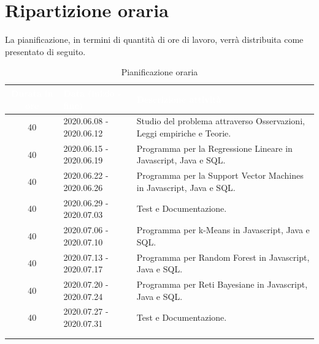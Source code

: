 \section{Ripartizione oraria}
La pianificazione, in termini di quantità di ore di lavoro, verrà distribuita come presentato di seguito.
{\renewcommand{\arraystretch}{2}
\begin{longtable}{|c|p{4cm}|p{7cm}|}
	
		\hline \rowcolor{blue}
		\textbf{\textcolor{white}{Durata in ore}} &
		\textbf{\textcolor{white}{Data (inizio - fine)}} & 
		\textbf{\textcolor{white}{Descrizione attività}}  \\ \hline
		\endhead
		\hline \rowcolor{lightbrown}
		40 & 
		2020.06.08 - 2020.06.12 & 
		Studio del problema attraverso Osservazioni, Leggi empiriche e Teorie. \\	
	\hline \rowcolor{lighterbrown}
		40 & 
		2020.06.15 - 2020.06.19 & 
		Programma per la Regressione Lineare in Javascript, Java e SQL. \\	
		\hline \rowcolor{lightbrown}
		40 & 
		2020.06.22 - 2020.06.26 & 
		Programma per la Support Vector Machines in Javascript, Java e SQL. \\	
	\hline \rowcolor{lighterbrown}
		40 & 
		2020.06.29 - 2020.07.03 & 
		Test e Documentazione. \\
		\hline \rowcolor{lightbrown}
		40 & 
		2020.07.06 - 2020.07.10 & 
		Programma per k-Means in Javascript, Java  e SQL. \\	
	\hline \rowcolor{lighterbrown}
		40 & 
		2020.07.13 - 2020.07.17 & 
		Programma per Random Forest in Javascript, Java e SQL. \\
	\hline \rowcolor{lightbrown}
		40 & 
		2020.07.20 - 2020.07.24 & 
		 Programma per Reti Bayesiane in Javascript, Java e SQL. \\
	\hline \rowcolor{lighterbrown}
		40 & 
		2020.07.27 - 2020.07.31 & 
		Test e Documentazione. \\
	\hline \rowcolor{lightbrown}
	\multicolumn{3}{|c|}{\textbf{320 ore}}\\
	\hline
		\caption{Pianificazione oraria}\label{tab:ore}
\end{longtable}}	

